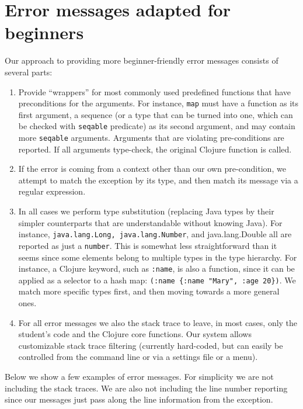 \documentclass[submission,copyright,creativecommons]{eptcs}
\newcommand{\allcomments}[1]{{#1}}
\newcommand{\hfcomment}[1]{\textcolor{Teal}{\allcomments{Henry: {#1}}}}
\begin{document}
\section{Error messages adapted for beginners}\label{sec:errors-work}
Our approach to providing more beginner-friendly error messages consists of several parts:
\begin{enumerate}
\item Provide ``wrappers'' for most commonly used predefined functions that have preconditions
for the arguments. For instance, {\tt map} must have a function as its first argument, a sequence 
(or a type that can be turned into one, which can be checked with {\tt seqable} predicate) as its second argument, 
and may contain more {\tt seqable}  arguments. Arguments that are violating pre-conditions are reported. 
If all arguments type-check, the original Clojure function is called. 
\item If the error is coming from a context other than our own pre-condition, we attempt to match the exception by its
type, and then match its message via a regular expression. 
\item In all cases we perform type substitution (replacing Java types by their simpler counterparts that are 
understandable without knowing Java). For instance, {\tt java.lang.Long, java.lang.Number}, and
{java.lang.Double} all are reported as just a {\tt number}. This is somewhat less straightforward than it seems since 
some elements belong to multiple types in the type hierarchy. For instance, a Clojure keyword, such as {\tt :name}, is also a function, since 
it can be applied as a selector to a hash map: {\tt (:name \{:name "Mary", :age 20\})}. We match more specific types first, and then moving towards 
a more general ones. 
\item For all error messages we also the stack trace to leave, in most cases, only the student's code and the Clojure core functions. 
Our system allows customizable stack trace filtering (currently hard-coded, but can easily be controlled from the command line or via a 
settings file or a menu). 
\end{enumerate}
Below we show a few examples of error messages. For simplicity we are not including the stack traces. We are also not
including the line number reporting since our messages just pass along the line information from the exception. 

\end{document}
